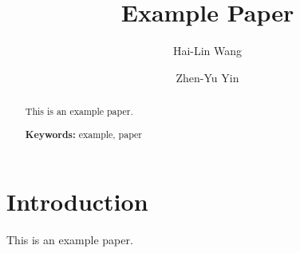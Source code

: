 \documentclass[
    Journal,
    letterpaper
]{ascelike-new}
\begin{document}
\title{Example Paper}

\author[1]{Hai-Lin Wang}
\author[1,*]{Zhen-Yu Yin}


\maketitle

\begin{abstract}
This is an example paper.

\noindent
\textbf{Keywords:}  example,  paper

\end{abstract}

\hypertarget{introduction}{%
\section{Introduction}\label{introduction}}

This is an example paper.

%
%
\label{section:references}


\listoftables
\listoffigures
\end{document}
